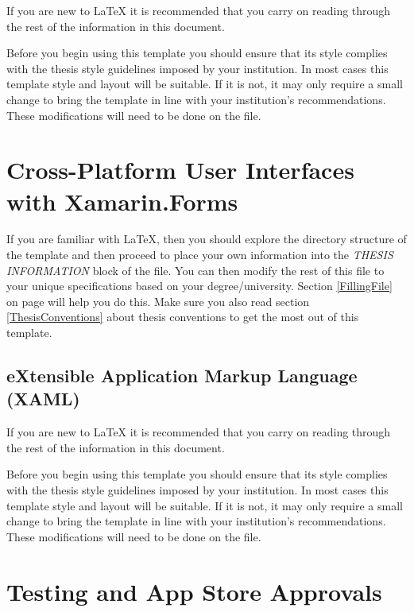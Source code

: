 If you are new to \LaTeX{} it is recommended that you carry on reading through the rest of the information in this document.

Before you begin using this template you should ensure that its style complies with the thesis style guidelines imposed by your institution. In most cases this template style and layout will be suitable. If it is not, it may only require a small change to bring the template in line with your institution's recommendations. These modifications will need to be done on the  file.


\section{Cross-Platform User Interfaces with Xamarin.Forms}

If you are familiar with \LaTeX{}, then you should explore the directory structure of the template and then proceed to place your own information into the \emph{THESIS INFORMATION} block of the  file. You can then modify the rest of this file to your unique specifications based on your degree/university. Section \ref{FillingFile} on page \pageref{FillingFile} will help you do this. Make sure you also read section \ref{ThesisConventions} about thesis conventions to get the most out of this template.

\subsection{eXtensible Application Markup Language (XAML)}
If you are new to \LaTeX{} it is recommended that you carry on reading through the rest of the information in this document.

Before you begin using this template you should ensure that its style complies with the thesis style guidelines imposed by your institution. In most cases this template style and layout will be suitable. If it is not, it may only require a small change to bring the template in line with your institution's recommendations. These modifications will need to be done on the  file.




\section{Testing and App Store Approvals}

